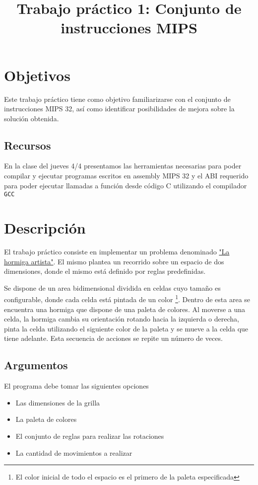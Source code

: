 \documentclass{article}
\title{Trabajo práctico 1: Conjunto de instrucciones MIPS}
\begin{document}
\date{}
\maketitle
\section{Objetivos}
Este trabajo práctico tiene como objetivo familiarizarse con el conjunto de instrucciones
MIPS 32, así como identificar posibilidades de mejora sobre la solución obtenida.

\subsection{Recursos}
En la clase del jueves 4/4 presentamos las herramientas necesarias para poder compilar y ejecutar
programas escritos en assembly MIPS 32 y el ABI requerido para poder ejecutar llamadas a 
función desde código C utilizando el compilador \texttt{GCC}

\section{Descripción}
El trabajo práctico consiste en implementar un problema denominado \underline{"La hormiga artista"}. El mismo plantea un recorrido
sobre un espacio de dos dimensiones, donde el mismo está definido por reglas predefinidas.

Se dispone de un area bidimensional dividida en celdas cuyo tamaño es configurable, donde cada celda está pintada de un color 
\footnote{El color inicial de todo el espacio es el primero de la paleta especificada}. Dentro de esta area se encuentra una
hormiga que dispone de una paleta de colores. Al moverse a una celda, la hormiga cambia su orientación rotando hacia la izquierda o 
derecha, pinta la celda utilizando el siguiente color de la paleta y se mueve a la celda que tiene adelante. Esta secuencia de 
acciones se repite un número de veces.

\subsection{Argumentos}

El programa debe tomar las siguientes opciones
\begin{itemize}
\item Las dimensiones de la grilla
\item La paleta de colores
\item El conjunto de reglas para realizar las rotaciones
\item La cantidad de movimientos a realizar
\end{itemize}
\end{document}
